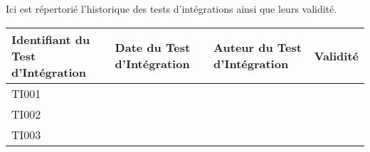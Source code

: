 
Ici est répertorié l'historique des tests d'intégrations ainsi que leurs validité. \\

\begin{table}[H]
\centering
	\begin{tabularx}{17.4cm}{|X|X|X|X|}
	\hline
	\rowcolor{gray!40} Identifiant du Test d'Intégration & Date du Test d'Intégration & Auteur du Test d'Intégration & Validité\\
	\hline
	 TI001 &  & & \\
	\hline
	 TI002 &  & & \\
	\hline
	 TI003 &  & & \\
	\hline
	\end{tabularx}
\end{table}

